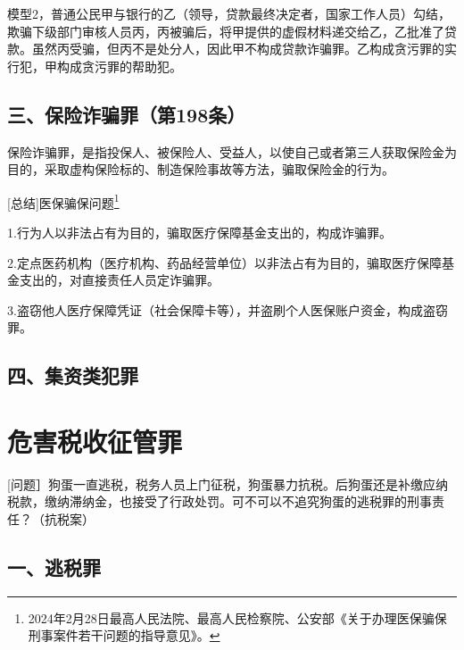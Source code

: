 模型2，普通公民甲与银行的乙（领导，贷款最终决定者，国家工作人员）勾结，欺骗下级部门审核人员丙，丙被骗后，将甲提供的虚假材料递交给乙，乙批准了贷款。虽然丙受骗，但丙不是处分人，因此甲不构成贷款诈骗罪。乙构成贪污罪的实行犯，甲构成贪污罪的帮助犯。

\subsection*{三、保险诈骗罪（第198条）}

保险诈骗罪，是指投保人、被保险人、受益人，以使自己或者第三人获取保险金为目的，采取虚构保险标的、制造保险事故等方法，骗取保险金的行为。



[总结]医保骗保问题\footnote{2024年2月28日最高人民法院、最高人民检察院、公安部《关于办理医保骗保刑事案件若干问题的指导意见》。}

1.行为人以非法占有为目的，骗取医疗保障基金支出的，构成诈骗罪。

2.定点医药机构（医疗机构、药品经营单位）以非法占有为目的，骗取医疗保障基金支出的，对直接责任人员定诈骗罪。

3.盗窃他人医疗保障凭证（社会保障卡等），并盗刷个人医保账户资金，构成盗窃罪。

\subsection*{四、集资类犯罪}



\section{危害税收征管罪}

[问题］狗蛋一直逃税，税务人员上门征税，狗蛋暴力抗税。后狗蛋还是补缴应纳税款，缴纳滞纳金，也接受了行政处罚。可不可以不追究狗蛋的逃税罪的刑事责任？（抗税案）

\subsection*{一、逃税罪}

